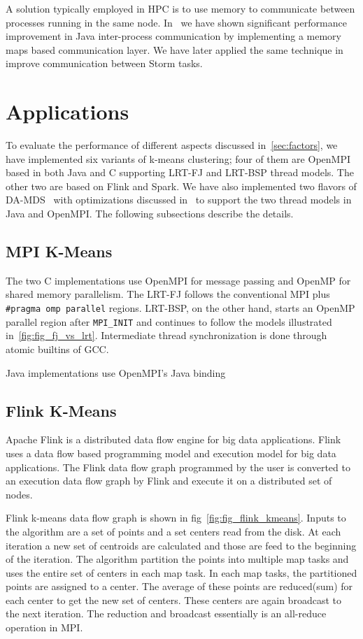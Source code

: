 \documentclass[10pt, conference, compsocconf]{IEEEtran}
\begin{document}
A solution typically employed in \ac{HPC} is to use memory to communicate between processes running in the same node. In~\cite{hpc2016:spidaljava} we have shown significant performance improvement in Java inter-process communication by implementing a memory maps based communication layer. We have later applied the same technique in~\cite{kamburugamuve2016towards} improve communication between Storm tasks.

\section{Applications} \label{sec:applications}
To evaluate the performance of different aspects discussed in~\ref{sec:factors}, we have implemented six variants of k-means clustering; four of them are OpenMPI based in both Java and C supporting \ac{LRT-FJ} and \ac{LRT-BSP} thread models. The other two are based on Flink and Spark. We have also implemented two flavors of \ac{DA-MDS}~\cite{Ruan:2013:RSS:2547685.2547700} with optimizations discussed in~\cite{hpc2016:spidaljava} to support the two thread models in Java and OpenMPI. The following subsections describe the details.

\subsection{\ac{MPI} K-Means}
The two C implementations use OpenMPI for message passing and OpenMP for shared memory parallelism. The \ac{LRT-FJ} follows the conventional \ac{MPI} plus \texttt{\#pragma omp parallel} regions. \ac{LRT-BSP}, on the other hand, starts an OpenMP parallel region after \texttt{MPI\_INIT} and continues to follow the models illustrated in~\ref{fig:fig_fj_vs_lrt}. Intermediate thread synchronization is done through atomic builtins of \ac{GCC}. 

Java implementations use OpenMPI's Java binding


\subsection{Flink K-Means}
Apache Flink is a distributed data flow engine for big data applications. Flink uses a data flow based programming model and execution model for big data applications. The Flink data flow graph programmed by the user is converted to an execution data flow graph by Flink and execute it on a distributed set of nodes.

Flink k-means data flow graph is shown in fig~\ref{fig:fig_flink_kmeans}. Inputs to the algorithm are a set of points and a set centers read from the disk. At each iteration a new set of centroids are calculated and those are feed to the beginning of the iteration. The algorithm partition the points into multiple map tasks and uses the entire set of centers in each map task. In each map tasks, the partitioned points are assigned to a center. The average of these points are reduced(sum) for each center to get the new set of centers. These centers are again broadcast to the next iteration. The reduction and broadcast essentially is an all-reduce operation in MPI.
\end{document}
